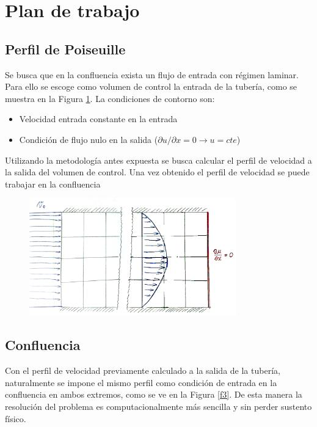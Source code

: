 \section{Plan de trabajo}

\subsection{Perfil de Poiseuille}

Se busca que en la confluencia exista un flujo de entrada con régimen laminar. Para ello se escoge como volumen de control la entrada de la tubería, como se muestra en la Figura \ref{f2}. La condiciones de contorno son: 
\begin{itemize}
\item Velocidad entrada constante en la entrada
\item Condición de flujo nulo en la salida ($\partial u / \partial x = 0 \rightarrow u = cte$)
\end{itemize}

Utilizando la metodología antes expuesta se busca calcular el perfil de velocidad a la salida del volumen de control. Una vez obtenido el perfil de velocidad se puede trabajar en la confluencia

\begin{figure}[H]
\centering
\includegraphics[width=0.8\textwidth]{f2.png}
\caption{ } \label{f2}
\end{figure}

\subsection{Confluencia}

Con el perfil de velocidad previamente calculado a la salida de la tubería, naturalmente se impone el mismo perfil como condición de entrada en la confluencia en ambos extremos, como se ve en la Figura \ref{f3}. De esta manera la resolución del problema es computacionalmente más sencilla y sin perder sustento físico. \\

